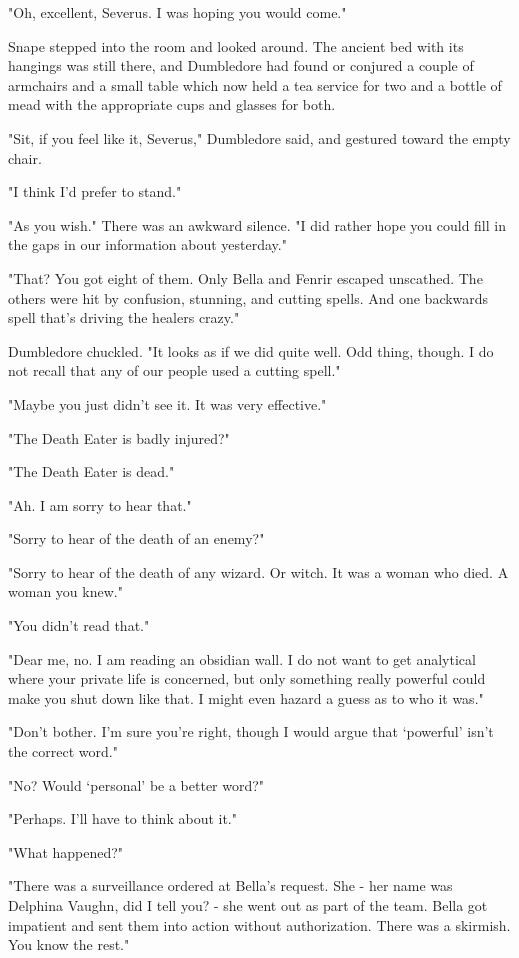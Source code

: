 "Oh, excellent, Severus. I was hoping you would come."

Snape stepped into the room and looked around. The ancient bed with its hangings was still there, and Dumbledore had found or conjured a couple of armchairs and a small table which now held a tea service for two and a bottle of mead with the appropriate cups and glasses for both.

"Sit, if you feel like it, Severus," Dumbledore said, and gestured toward the empty chair.

"I think I'd prefer to stand."

"As you wish." There was an awkward silence. "I did rather hope you could fill in the gaps in our information about yesterday."

"That? You got eight of them. Only Bella and Fenrir escaped unscathed. The others were hit by confusion, stunning, and cutting spells. And one backwards spell that's driving the healers crazy."

Dumbledore chuckled. "It looks as if we did quite well. Odd thing, though. I do not recall that any of our people used a cutting spell."

"Maybe you just didn't see it. It was very effective."

"The Death Eater is badly injured?"

"The Death Eater is dead."

"Ah. I am sorry to hear that."

"Sorry to hear of the death of an enemy?"

"Sorry to hear of the death of any wizard. Or witch. It was a woman who died. A woman you knew."

"You didn't read that."

"Dear me, no. I am reading an obsidian wall. I do not want to get analytical where your private life is concerned, but only something really powerful could make you shut down like that. I might even hazard a guess as to who it was."

"Don't bother. I'm sure you're right, though I would argue that `powerful' isn't the correct word."

"No? Would `personal' be a better word?"

"Perhaps. I'll have to think about it."

"What happened?"

"There was a surveillance ordered at Bella's request. She - her name was Delphina Vaughn, did I tell you? - she went out as part of the team. Bella got impatient and sent them into action without authorization. There was a skirmish. You know the rest."

